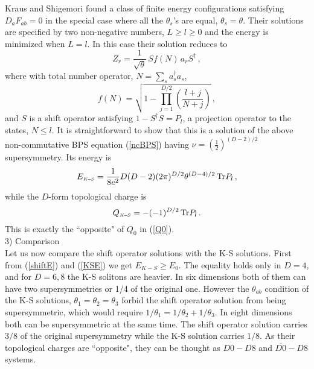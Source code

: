 \documentclass[a4paper,11pt]{article}
\def\Tr{{\rm Tr}}
\begin{document}
Kraus and Shigemori found a class of finite energy configurations  satisfying $D_{a}F_{ab}=0$ in the special case where all the $\theta_{s}$'s are
equal, $\theta_{s}=\theta$. Their solutions are specified by two non-negative numbers,  $L\geq l\geq 0$ and the energy is minimized when $L=l$. In
this case  their solution reduces to
\begin{equation}
Z_{r}=\frac{1}{\sqrt{\theta}}\,Sf(N)\,a_{r}S^{\dagger}\,,
\end{equation}
where with total number operator, $N=\sum_{s}a^{\dagger}_{s}a_{s}$,
\begin{equation}
f(N)=\sqrt{1-\prod_{j=1}^{D/2}\left(\frac{l+j}{N+j}\right)}\,,
\end{equation}
and $S$ is a shift operator satisfying $1-S^{\dagger}S=P_{l}$, a projection operator to the states, $N\leq l$.  It is
straightforward to show that this is a solution of the above  non-commutative BPS equation (\ref{ncBPS}) having
$\nu=(\frac{1}{2})^{(D-2)/2}$ supersymmetry.  Its energy is
\begin{equation}
E_{{\scriptscriptstyle K\!-\!S}}=\displaystyle{\frac{1}{8e^{2}}D(D-2)(2\pi)^{D/2}\theta^{(D-4)/2}\,\Tr P_{l}\,,} \label{KSE}
\end{equation}
while the $D$-form topological charge is
\begin{equation}
Q_{{\scriptscriptstyle K\!-\!S}}=-(-1)^{D/2}\,\Tr P_{l}\,.
\end{equation}
This is exactly the ``opposite" of $Q_{0}$ in (\ref{Q0}).\\



3) Comparison\\
Let us now compare the shift operator solutions with the K-S solutions. First from  (\ref{shiftE}) and (\ref{KSE})  we get $E_{{\scriptscriptstyle
K\!-\!S}}\geq E_{0}$. The equality holds only in $D=4$, and for $D=6,8$ the K-S solitons are heavier. In six dimensions both of them can have two
supersymmetries or 1/4 of the original one. However the $\theta_{ab}$ condition  of the K-S solutions, $\theta_{1}=\theta_{2}=\theta_{3}$ forbid the
shift operator solution from being supersymmetric, which would require $1/\theta_{1}=1/\theta_{2}+1/\theta_{3}$.   In eight dimensions both can be
supersymmetric  at the same time. The shift operator solution carries $3/8$ of the original supersymmetry while the K-S solution carries $1/8$. As
their topological charges are ``opposite", they can be thought as $D0-D8$ and $\overline{D0}-D8$ systems.
\end{document}
